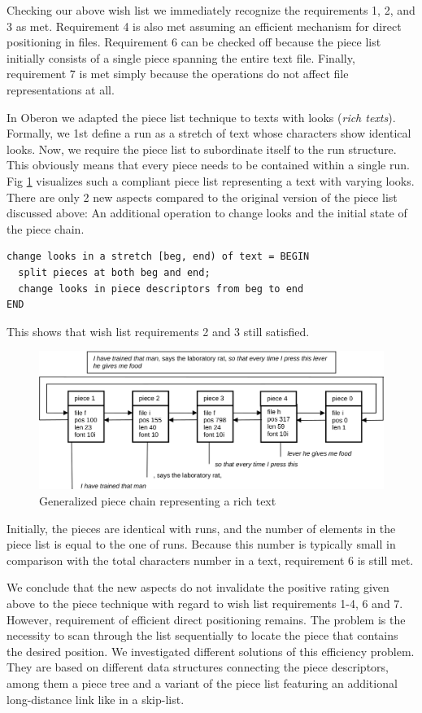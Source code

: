 Checking our above wish list we immediately recognize the requirements 1, 2, and 3 as met.
Requirement 4 is also met assuming an efficient mechanism for direct positioning in files.
Requirement 6 can be checked off because the piece list initially consists of a single piece
spanning the entire text file.  Finally, requirement 7 is met simply because the operations
do not affect file representations at all.

In Oberon we adapted the piece list technique to texts with looks (\emph{rich texts}).
Formally, we 1st define a run as a stretch of text whose characters show identical looks.
Now, we require the piece list to subordinate itself to the run structure.
This obviously means that every piece needs to be contained within a single run.
Fig \ref{fig:chain-generalized} visualizes such a compliant piece list representing a text
with varying looks.  There are only 2 new aspects compared to the original version
of the piece list discussed above:
An additional operation to change looks and the initial state of the piece chain.
\begin{verbatim}
change looks in a stretch [beg, end) of text = BEGIN
  split pieces at both beg and end;
  change looks in piece descriptors from beg to end
END
\end{verbatim}
This shows that wish list requirements 2 and 3 still satisfied.
\begin{figure}[h!]
  \centering
  \includegraphics[width=.8\textwidth]{i/g}
  \caption{Generalized piece chain representing a rich text}
  \label{fig:chain-generalized}
\end{figure}

Initially, the pieces are identical with runs, and the number of elements in the piece list
is equal to the one of runs.  Because this number is typically small in comparison with
the total characters number in a text, requirement 6 is still met.

We conclude that the new aspects do not invalidate the positive rating given above
to the piece technique with regard to wish list requirements 1-4, 6 and 7.  However,
requirement of efficient direct positioning remains.  The problem is the necessity
to scan through the list sequentially to locate the piece that contains the desired position.
We investigated different solutions of this efficiency problem.  They are based on
different data structures connecting the piece descriptors, among them a piece tree
and a variant of the piece list featuring an additional long-distance link like in a skip-list.

